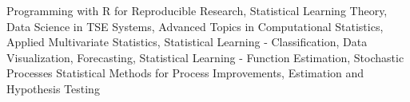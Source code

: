 \documentclass[letterpaper,10pt]{article}
\begin{document}
\vspace{2pt}
{\footnotesize
Programming with R for Reproducible Research, 
Statistical Learning Theory, 
Data Science in TSE Systems,
Advanced Topics in Computational Statistics, 
Applied Multivariate Statistics,
Statistical Learning - Classification, 
Data Visualization,
Forecasting, 
Statistical Learning - Function Estimation, 
Stochastic Processes
Statistical Methods for Process Improvements,
Estimation and Hypothesis Testing
}
\end{document}
